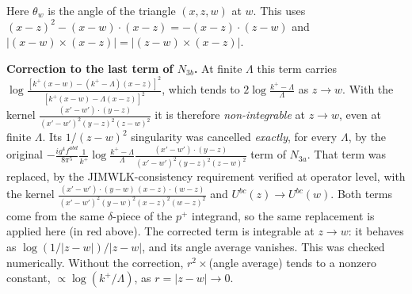 \documentclass[9pt]{article}
\numberwithin{equation}{section}
\begin{document}
{\color{red}Here $\theta_{w}$ is the angle of the triangle $(x,z,w)$ at $w$. This uses $(x-z)^{2}-(x-w)\cdot(x-z)=-(x-z)\cdot(z-w)$ and $|(x-w)\times(x-z)|=|(z-w)\times(x-z)|$.

\noindent\textbf{Correction to the last term of $N_{3b}$.} At finite $\Lambda$ this term carries $\log\frac{[k^{+}(x-w)-(k^{+}-\Lambda)(x-z)]^{2}}{[k^{+}(x-w)-\Lambda(x-z)]^{2}}$, which tends to $2\log\frac{k^{+}-\Lambda}{\Lambda}$ as $z\to w$. With the kernel $\frac{(x'-w')\cdot(y-z)}{(x'-w')^{2}(y-z)^{2}(z-w)^{2}}$ it is therefore \emph{non-integrable} at $z\to w$, even at finite $\Lambda$. Its $1/(z-w)^{2}$ singularity was cancelled \emph{exactly}, for every $\Lambda$, by the original $-\frac{ig^{4}f^{abd}}{8\pi^{5}}\frac{1}{k^{+}}\log\frac{k^{+}-\Lambda}{\Lambda}\frac{(x'-w')\cdot(y-z)}{(x'-w')^{2}(y-z)^{2}(z-w)^{2}}$ term of $N_{3a}$. That term was replaced, by the JIMWLK-consistency requirement verified at operator level, with the kernel $\frac{(x'-w')\cdot(y-w)\,(x-z)\cdot(w-z)}{(x'-w')^{2}(y-w)^{2}(x-z)^{2}(w-z)^{2}}$ and $U^{bc}(z)\to U^{bc}(w)$. Both terms come from the same $\delta$-piece of the $p^{+}$ integrand, so the same replacement is applied here (in red above). The corrected term is integrable at $z\to w$: it behaves as $\log(1/|z-w|)/|z-w|$, and its angle average vanishes. This was checked numerically. Without the correction, $r^{2}\times$(angle average) tends to a nonzero constant, $\propto\log(k^{+}/\Lambda)$, as $r=|z-w|\to0$.}
\end{document}

